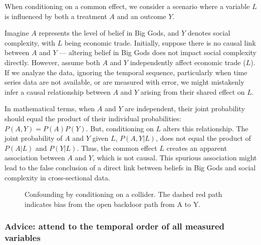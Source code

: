 \documentclass[
  singlecolumn,
  9pt]{article}
\begin{document}
When conditioning on a common effect, we consider a scenario where a
variable \(L\) is influenced by both a treatment \(A\) and an outcome
\(Y\).

Imagine \(A\) represents the level of belief in Big Gods, and \(Y\)
denotes social complexity, with \(L\) being economic trade. Initially,
suppose there is no causal link between \(A\) and \(Y\) --- altering
belief in Big Gods does not impact social complexity directly. However,
assume both \(A\) and \(Y\) independently affect economic trade (\(L\)).
If we analyze the data, ignoring the temporal sequence, particularly
when time series data are not available, or are measured with error, we
might mistakenly infer a causal relationship between \(A\) and \(Y\)
arising from their shared effect on \(L\).

In mathematical terms, when \(A\) and \(Y\) are independent, their joint
probability should equal the product of their individual probabilities:
\(P(A, Y) = P(A)P(Y)\). But, conditioning on \(L\) alters this
relationship. The joint probability of \(A\) and \(Y\) given \(L\),
\(P(A, Y | L)\), does not equal the product of \(P(A | L)\) and
\(P(Y | L)\). Thus, the common effect \(L\) creates an apparent
association between \(A\) and \(Y\), which is not causal. This spurious
association might lead to the false conclusion of a direct link between
beliefs in Big Gods and social complexity in cross-sectional data.

\begin{figure}


\caption{\label{fig-dag-common-effect}Confounding by conditioning on a
collider. The dashed red path indicates bias from the open backdoor path
from A to Y.}

\end{figure}%

\subsubsection{Advice: attend to the temporal order of all measured
variables}\label{advice-attend-to-the-temporal-order-of-all-measured-variables}
\end{document}
